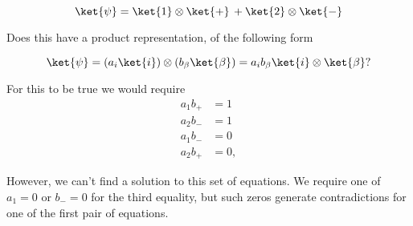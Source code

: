 \begin{equation}\label{eqn:entangledSimpleExample:n}
\ket{\psi} = \ket{1} \otimes \ket{+} \,+ \ket{2} \otimes \ket{-}
\end{equation}

Does this have a product representation, of the following form

\begin{equation}\label{eqn:entangledSimpleExample:n}
\ket{\psi} = (a_{i} \ket{i}) \otimes (b_{\beta} \ket{\beta}) = a_{i} b_{\beta} \ket{i} \otimes \ket{\beta}?
\end{equation}

For this to be true we would require
\begin{align*}
a_1 b_{+} &= 1 \\
a_2 b_{-} &= 1 \\
a_1 b_{-} &= 0 \\
a_2 b_{+} &= 0,
\end{align*}

However, we can't find a solution to this set of equations.  We require one of $a_1 = 0$ or $b_{-} = 0$ for the third equality, but such zeros generate contradictions for one of the first pair of equations.

\EndNoBibArticle
